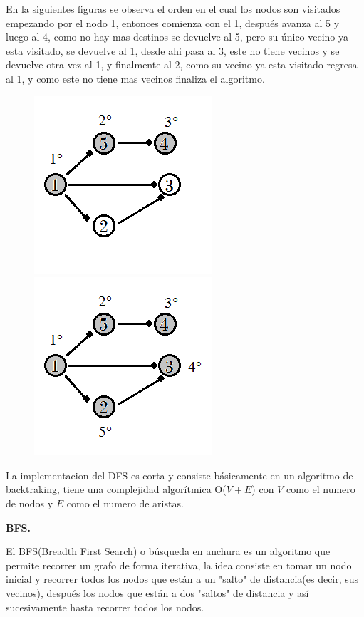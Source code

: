 \documentclass[12pt, a4paper]{article}
\newcommand\cppfile[2][]{

}
\newcommand{\subtitulo}[1]{\begin{center}\textbf{#1}\end{center}}
\begin{document}
	En la siguientes figuras se observa el orden en el cual los nodos son visitados empezando por el nodo 1, 
	entonces comienza con el 1, después avanza al 5 y luego al 4, como no hay mas destinos se devuelve al 5,
	pero su único vecino ya esta visitado, se devuelve al 1, desde ahi pasa al 3, este no tiene vecinos y se
	devuelve otra vez al 1, y finalmente al 2, como su vecino ya esta visitado regresa al 1, y como este no tiene
	mas vecinos finaliza el algoritmo.
	
	\begin{figure}[!htb]
			\centering
			\includegraphics[scale=1]{Grafos/imagenes/DFS1}
			\caption{}%
		\endminipage
			\centering
			\includegraphics[scale=1]{Grafos/imagenes/DFS2}
			\caption{}%
		\endminipage
	\end{figure}	
	
	La implementacion del DFS es corta y consiste básicamente en un algoritmo de backtraking, tiene una complejidad
	algorítmica O($V+E$) con $V$ como el numero de nodos y $E$ como el numero de aristas.
	\cppfile[6-16]{Grafos/codigos/DFS.cpp}
	
	\subtitulo{BFS.}
	
	El BFS(Breadth First Search) o búsqueda en anchura es un algoritmo que permite recorrer un grafo de forma
	iterativa, la idea consiste en tomar un nodo inicial y recorrer todos los nodos que están a un "salto" de 
	distancia(es decir, sus vecinos), después los nodos que están a dos "saltos" de distancia y así sucesivamente hasta
	recorrer todos los nodos.\\
	
\end{document}
